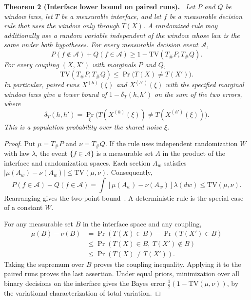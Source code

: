 \documentclass[10pt]{article}
\newcommand{\TV}{\mathrm{TV}}
\newenvironment{result}[1]{\par\medskip\noindent\textbf{#1.}\ \itshape\ignorespaces}{\par\medskip}
\theoremstyle{plain}
\theoremstyle{remark}
\begin{document}
\begin{result}{Theorem 2 (Interface lower bound on paired runs)}
Let $P$ and $Q$ be window laws, let $T$ be a measurable interface, and let $f$ be a measurable decision rule that uses the window only through $T(X)$. A randomized rule may additionally use a random variable independent of the window whose law is the same under both hypotheses. For every measurable decision event $\mathcal A$,
\[
 P(f\notin\mathcal A)+Q(f\in\mathcal A)
 \ge 1-\TV(T_\#P,T_\#Q).
\]
For every coupling $(X,X')$ with marginals $P$ and $Q$,
\[
 \TV(T_\#P,T_\#Q)\le \Pr\bigl(T(X)\ne T(X')\bigr).
\]
In particular, paired runs $X^{(h)}(\xi)$ and $X^{(h')}(\xi)$ with the specified marginal window laws give a lower bound of $1-\delta_T(h,h')$ on the sum of the two errors, where
\[
 \delta_T(h,h')=\Pr_\xi\bigl(T(X^{(h)}(\xi))
                  \ne T(X^{(h')}(\xi))\bigr).
\]
This is a population probability over the shared noise $\xi$.
\end{result}

\begin{proof}
Put $\mu=T_\#P$ and $\nu=T_\#Q$. If the rule uses independent randomization $W$ with law $\lambda$, the event $\{f\in\mathcal A\}$ is a measurable set $A$ in the product of the interface and randomization spaces. Each section $A_w$ satisfies $|\mu(A_w)-\nu(A_w)|\le\TV(\mu,\nu)$. Consequently,
\[
 P(f\in\mathcal A)-Q(f\in\mathcal A)
 =\int[\mu(A_w)-\nu(A_w)]\lambda(dw)
 \le\TV(\mu,\nu).
\]
Rearranging gives the two-point bound~\cite{LeCam1973}. A deterministic rule is the special case of a constant $W$.

For any measurable set $B$ in the interface space and any coupling,
\begin{align*}
 \mu(B)-\nu(B)
 &=\Pr(T(X)\in B)-\Pr(T(X')\in B)\\
 &\le\Pr(T(X)\in B,\ T(X')\notin B)\\
 &\le\Pr(T(X)\ne T(X')).
\end{align*}
Taking the supremum over $B$ proves the coupling inequality. Applying it to the paired runs proves the last assertion. Under equal priors, minimization over all binary decisions on the interface gives the Bayes error $\tfrac12(1-\TV(\mu,\nu))$, by the variational characterization of total variation.
\end{proof}
\end{document}
